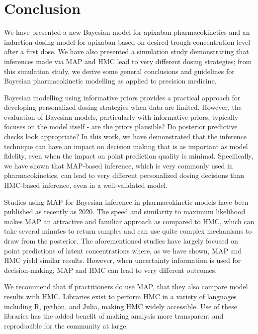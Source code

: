 \section{Conclusion}
We have presented a new Bayesian model for apixaban pharmacokinetics and an induction dosing model for apixaban based on desired trough concentration level after a first dose. We have also presented a simulation study demonstrating that inferences made via MAP and HMC lead to very different dosing strategies; from this simulation study, we derive some general conclusions and guidelines for Bayesian pharmacokinetic modelling as applied to precision medicine.

Bayesian modelling using informative priors provides a practical approach for developing personalized dosing strategies when data are limited. However, the evaluation of Bayesian models, particularly with informative priors, typically focuses on the model itself - are the priors plausible? Do posterior predictive checks look appropriate? In this work, we have demonstrated that the inference technique can have an impact on decision making that is as important as model fidelity, even when the impact on point prediction quality is minimal. Specifically, we have shown that MAP-based inference, which is very commonly used in pharmacokinetics, can lead to very different personalized dosing decisions than HMC-based inference, even in a well-validated model.

Studies using MAP for Bayesian inference in pharmacokinetic models have been published as recently as 2020.  The speed and similarity to maximum likelihood makes MAP an attractive and familiar approach as compared to HMC, which can take several minutes to return samples and can use quite complex mechanisms to draw from the posterior. The aforementioned studies have largely focused on point predictions of latent concentrations where, as we have shown, MAP and HMC yield similar results. However, when uncertainty information is used for decision-making, MAP and HMC can lead to very different outcomes.

We recommend that if practitioners do use MAP, that they also compare model results with HMC.  Libraries exist to perform HMC in a variety of languages including R, python, and Julia, making HMC widely accessible.  Use of these libraries has the added benefit of making analysis more transparent and reproducible for the community at large.

